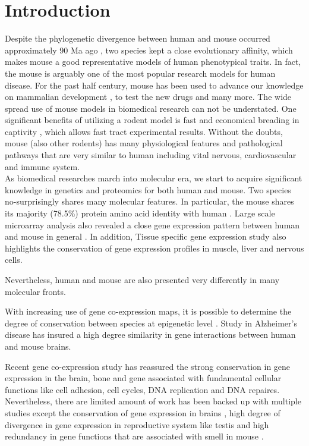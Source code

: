 \section{Introduction}

Despite the phylogenetic divergence between human and mouse occurred approximately 90 Ma ago \cite{Hedges_2006}, two species kept a close evolutionary affinity, which makes mouse a good representative models of human phenotypical traits. In fact, the mouse is arguably one of the most popular research models for human disease. For the past half century, mouse has been used to advance our knowledge on mammalian development \cite{Ueda_2006, Cheon_2011}, to test the new drugs \cite{Van_Dam_2011} and many more. The wide spread use of mouse models in biomedical research can not be understated. \cite{MORSEIII_2007} One significant benefits of utilizing a rodent model is fast and economical breading in captivity \cite{Rosenthal_2007}, which allows fast tract experimental results. \cite{Vandamme_2014} Without the doubts, mouse (also other rodents) has many physiological features and pathological pathways that are very similar to human including vital nervous, cardiovascular and immune system. \cite{MORSEIII_2007,Rosenthal_2007} \\

As biomedical researches march into molecular era, we start to acquire significant knowledge in genetics and proteomics for both human and mouse. Two species no-surprisingly shares many molecular features. In particular, the mouse shares its majority (78.5\%) protein amino acid identity with human \cite{Lindblad_Toh_2001}. Large scale microarray analysis also revealed a close gene expression pattern between human and mouse in general \cite{Liao_2005}. In addition, Tissue specific gene expression study \cite{Zheng_Bradley_2010} also highlights the conservation of gene expression profiles in muscle, liver and nervous cells. 

Nevertheless, human and mouse are also presented very differently in many molecular fronts. 

With increasing use of gene co-expression maps, it is possible to determine the degree of conservation between species at epigenetic level \cite{Stuart_2003,Oldham_2006}. Study in Alzheimer's disease \cite{Miller_2010} has insured a high degree similarity in gene interactions between human and mouse brains. 

Recent gene co-expression study \cite{Monaco_2015} has reassured the strong conservation in gene expression in the brain, bone and gene associated with fundamental cellular functions like cell adhesion, cell cycles, DNA replication and DNA repaires. \cite{Monaco_2015} Nevertheless, there are limited amount of work has been backed up with multiple studies except the conservation of gene expression in brains \cite{Liao_2005, Voolstra_2006, Miller_2010, Chan_2009}, high degree of divergence in gene expression in reproductive system like testis \cite{Chan_2009, Brawand_2011, Necsulea_2014} and high redundancy in gene functions that are associated with smell in mouse \cite{Gilad_2009, Gilad_2003, Young_2002}. 
\\

